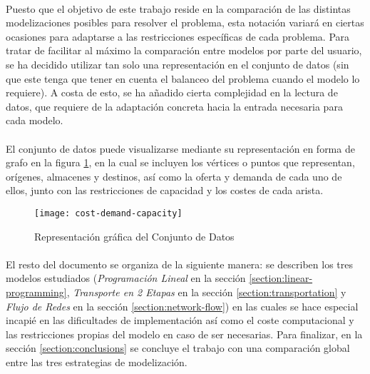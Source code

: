 \documentclass[a4paper, spanish]{article}
\begin{document}
    \paragraph{}
    Puesto que el objetivo de este trabajo reside en la comparación de las distintas modelizaciones posibles para resolver el problema, esta notación variará en ciertas ocasiones para adaptarse a las restricciones específicas de cada problema. Para tratar de facilitar al máximo la comparación entre modelos por parte del usuario, se ha decidido utilizar tan solo una representación en el conjunto de datos (sin que este tenga que tener en cuenta el balanceo del problema cuando el modelo lo requiere). A costa de esto, se ha añadido cierta complejidad en la lectura de datos, que requiere de la adaptación concreta hacia la entrada necesaria para cada modelo.

    \paragraph{}
    El conjunto de datos puede visualizarse mediante su representación en forma de grafo en la figura \ref{img:graph-network}, en la cual se incluyen los vértices o puntos que representan, orígenes, almacenes y destinos, así como la oferta y demanda de cada uno de ellos, junto con las restricciones de capacidad y los costes de cada arista.

    \begin{figure}[!hp]
      \centering
      \texttt{[image: cost-demand-capacity]}
      \caption{Representación gráfica del Conjunto de Datos}
      \label{img:graph-network}
    \end{figure}

    \paragraph{}
    El resto del documento se organiza de la siguiente manera: se describen los tres modelos estudiados (\emph{Programación Lineal} en la sección \ref{section:linear-programming}, \emph{Transporte en 2 Etapas} en la sección \ref{section:transportation} y \emph{Flujo de Redes} en la sección \ref{section:network-flow}) en las cuales se hace especial incapié en las dificultades de implementación así como el coste computacional y las restricciones propias del modelo en caso de ser necesarias. Para finalizar, en la sección \ref{section:conclusions} se concluye el trabajo con una comparación global entre las tres estrategias de modelización.
\end{document}
